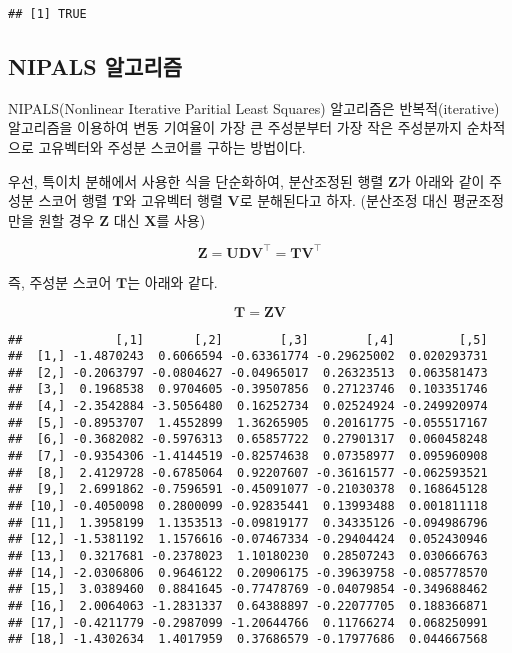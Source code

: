 \documentclass[]{book}
\newenvironment{Shaded}{\begin{snugshade}}{\end{snugshade}}
\newcommand{\NormalTok}[1]{#1}
\newcommand{\OperatorTok}[1]{\textcolor[rgb]{0.81,0.36,0.00}{\textbf{#1}}}
\newcommand{\StringTok}[1]{\textcolor[rgb]{0.31,0.60,0.02}{#1}}
\begin{document}
\begin{verbatim}
## [1] TRUE
\end{verbatim}

\hypertarget{pca-nipals}{%
\subsection{NIPALS 알고리즘}\label{pca-nipals}}

NIPALS(Nonlinear Iterative Paritial Least Squares) 알고리즘은 반복적(iterative) 알고리즘을 이용하여 변동 기여율이 가장 큰 주성분부터 가장 작은 주성분까지 순차적으로 고유벡터와 주성분 스코어를 구하는 방법이다.

우선, 특이치 분해에서 사용한 식을 단순화하여, 분산조정된 행렬 \(\mathbf{Z}\)가 아래와 같이 주성분 스코어 행렬 \(\mathbf{T}\)와 고유벡터 행렬 \(\mathbf{V}\)로 분해된다고 하자. (분산조정 대신 평균조정만을 원할 경우 \(\mathbf{Z}\) 대신 \(\mathbf{X}\)를 사용)

\[ \mathbf{Z} = \mathbf{U} \mathbf{D} \mathbf{V}^\top = \mathbf{T} \mathbf{V}^\top \]

즉, 주성분 스코어 \(\mathbf{T}\)는 아래와 같다.

\[ \mathbf{T} = \mathbf{Z} \mathbf{V} \]

\begin{Shaded}
\end{Shaded}

\begin{verbatim}
##             [,1]       [,2]        [,3]        [,4]         [,5]
##  [1,] -1.4870243  0.6066594 -0.63361774 -0.29625002  0.020293731
##  [2,] -0.2063797 -0.0804627 -0.04965017  0.26323513  0.063581473
##  [3,]  0.1968538  0.9704605 -0.39507856  0.27123746  0.103351746
##  [4,] -2.3542884 -3.5056480  0.16252734  0.02524924 -0.249920974
##  [5,] -0.8953707  1.4552899  1.36265905  0.20161775 -0.055517167
##  [6,] -0.3682082 -0.5976313  0.65857722  0.27901317  0.060458248
##  [7,] -0.9354306 -1.4144519 -0.82574638  0.07358977  0.095960908
##  [8,]  2.4129728 -0.6785064  0.92207607 -0.36161577 -0.062593521
##  [9,]  2.6991862 -0.7596591 -0.45091077 -0.21030378  0.168645128
## [10,] -0.4050098  0.2800099 -0.92835441  0.13993488  0.001811118
## [11,]  1.3958199  1.1353513 -0.09819177  0.34335126 -0.094986796
## [12,] -1.5381192  1.1576616 -0.07467334 -0.29404424  0.052430946
## [13,]  0.3217681 -0.2378023  1.10180230  0.28507243  0.030666763
## [14,] -2.0306806  0.9646122  0.20906175 -0.39639758 -0.085778570
## [15,]  3.0389460  0.8841645 -0.77478769 -0.04079854 -0.349688462
## [16,]  2.0064063 -1.2831337  0.64388897 -0.22077705  0.188366871
## [17,] -0.4211779 -0.2987099 -1.20644766  0.11766274  0.068250991
## [18,] -1.4302634  1.4017959  0.37686579 -0.17977686  0.044667568
\end{verbatim}
\end{document}
